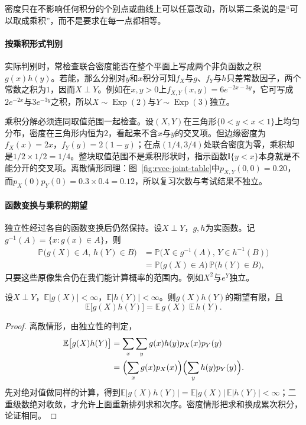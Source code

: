 密度只在不影响任何积分的个别点或曲线上可以任意改动，所以第二条说的是“可以取成乘积”，而不是要求在每一点都相等。

\paragraph{按乘积形式判别}
实际判别时，常检查联合密度能否在整个平面上写成两个非负函数之积$g(x)h(y)$。若能，那么分别对$y$和$x$积分可知$f_X$与$g$、$f_Y$与$h$只差常数因子，两个常数之积为$1$，因而$X\perp Y$。例如在$x,y>0$上$f_{X,Y}(x,y)=6e^{-2x-3y}$，它可写成$2e^{-2x}$与$3e^{-3y}$之积，所以$X\sim\operatorname{Exp}(2)$与$Y\sim\operatorname{Exp}(3)$独立。

乘积分解必须连同取值范围一起检查。设$(X,Y)$在三角形$\{0<y<x<1\}$上均匀分布，密度在三角形内恒为$2$，看起来不含$x$与$y$的交叉项。但边缘密度为$f_X(x)=2x$，$f_Y(y)=2(1-y)$；在点$(1/4,3/4)$处联合密度为零，乘积却是$1/2\times1/2=1/4$。整块取值范围不是乘积形状时，指示函数$\mathbb{I}\{y<x\}$本身就是不能分开的交叉项。离散情形同理：图~\ref{fig:rvec-joint-table}中$p_{X,Y}(0,0)=0.20$，而$p_X(0)p_Y(0)=0.3\times0.4=0.12$，所以复习次数与考试结果不独立。

\paragraph{函数变换与乘积的期望}
独立性经过各自的函数变换后仍然保持。设$X\perp Y$，$g,h$为实函数。记$g^{-1}(A)=\{x:g(x)\in A\}$，则
\[
\begin{aligned}
 \mathbb P\bigl(g(X)\in A,\,h(Y)\in B\bigr)&=\mathbb P\bigl(X\in g^{-1}(A),\,Y\in h^{-1}(B)\bigr)\\
 &=\mathbb P\bigl(g(X)\in A\bigr)\,\mathbb P\bigl(h(Y)\in B\bigr),
\end{aligned}
\]
只要这些原像集合仍在我们能计算概率的范围内。例如$X^2$与$e^{Y}$独立。

\begin{theorem}[独立变量乘积的期望]
\label{thm:rvec-product-expectation}
设$X\perp Y$，$\mathbb E|g(X)|<\infty$，$\mathbb E|h(Y)|<\infty$。则$g(X)h(Y)$的期望有限，且
\[
 \mathbb E\bigl[g(X)h(Y)\bigr]=\mathbb E\,g(X)\;\mathbb E\,h(Y).
\]
\end{theorem}

\begin{proof}
离散情形，由独立性的判定，
\[
\begin{aligned}
 \mathbb E\bigl[g(X)h(Y)\bigr]&=\sum_x\sum_yg(x)h(y)p_X(x)p_Y(y)\\
 &=\Bigl(\sum_xg(x)p_X(x)\Bigr)\Bigl(\sum_yh(y)p_Y(y)\Bigr).
\end{aligned}
\]
先对绝对值做同样的计算，得到$\mathbb E|g(X)h(Y)|=\mathbb E|g(X)|\,\mathbb E|h(Y)|<\infty$；二重级数绝对收敛，才允许上面重新排列求和次序。密度情形把求和换成累次积分，论证相同。
\end{proof}

